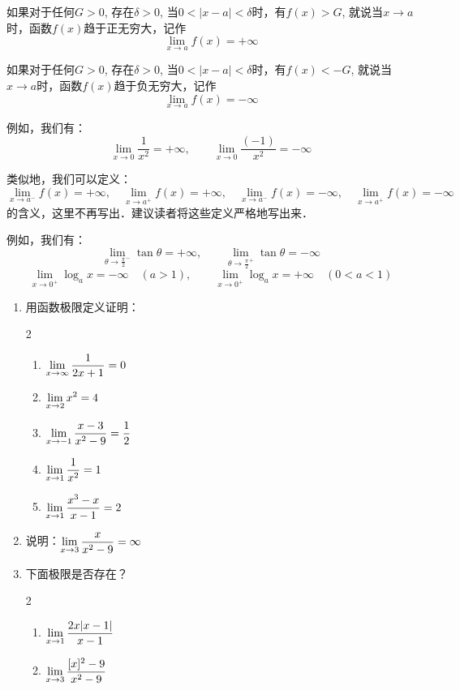 如果对于任何$G>0$, 存在$\delta>0$, 当$0<|x-a|<\delta$时，有$f(x)>G$, 就说当$x\to a$时，函数$f(x)$趋于正无穷大，记作
\[\lim_{x\to a}f(x)=+\infty\]

如果对于任何$G>0$, 存在$\delta>0$, 当$0<|x-a|<\delta$时，有$f(x)<-G$, 就说当$x\to a$时，函数$f(x)$趋于负无穷大，记作
\[\lim_{x\to a}f(x)=-\infty\]

例如，我们有：
\[\lim_{x\to 0}\frac{1}{x^2}=+\infty,\qquad \lim_{x\to 0}\frac{(-1)}{x^2}=-\infty\]

类似地，我们可以定义：
\[\lim_{x\to a^-}f(x)=+\infty,\quad \lim_{x\to a^+}f(x)=+\infty,\quad \lim_{x\to a^-}f(x)=-\infty,\quad \lim_{x\to a^+}f(x)=-\infty\]
的含义，这里不再写出．建议读者将这些定义严格地写出来．

例如，我们有：
\[\lim_{\theta\to \tfrac{\pi}{2}^-}\tan\theta =+\infty,\qquad \lim_{\theta\to \tfrac{\pi}{2}^+}\tan\theta =-\infty\]
\[\lim_{x\to 0^+}\log_a x =-\infty\quad (a>1),\qquad \lim_{x\to 0^+}\log_a x =+\infty\quad (0<a<1)\]

\begin{ex}
\begin{enumerate}
    \item 用函数极限定义证明：
    \begin{multicols}{2}
        \begin{enumerate}
            \item $\displaystyle\lim_{x\to \infty}\dfrac{1}{2x+1}=0$
            \item $\displaystyle\lim_{x\to 2}x^2=4$
            \item $\displaystyle\lim_{x\to -1}\dfrac{x-3}{x^2-9}=\dfrac{1}{2}$
            \item $\displaystyle\lim_{x\to 1}\dfrac{1}{x^2}=1$
            \item $\displaystyle\lim_{x\to 1}\dfrac{x^3-x}{x-1}=2$
        \end{enumerate}
    \end{multicols}
    \item 说明：$\displaystyle\lim_{x\to 3}\dfrac{x}{x^2-9}=\infty$
    \item 下面极限是否存在？
\begin{multicols}{2}
    \begin{enumerate}
        \item $\displaystyle\lim_{x\to 1}\dfrac{2x|x-1|}{x-1}$
        \item $\displaystyle\lim_{x\to 3}\dfrac{[x]^2-9}{x^2-9}$
    \end{enumerate}
\end{multicols}
\end{enumerate}
\end{ex}

